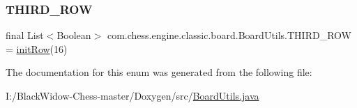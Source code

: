 \mbox{\label{enumcom_1_1chess_1_1engine_1_1classic_1_1board_1_1_board_utils_a1586314b421d641c7b8365956e7d7a90}} 
\subsubsection{\texorpdfstring{THIRD\_ROW}{THIRD\_ROW}}
{\footnotesize\ttfamily final List$<$Boolean$>$ com.\+chess.\+engine.\+classic.\+board.\+Board\+Utils.\+T\+H\+I\+R\+D\+\_\+\+R\+OW = \mbox{\hyperlink{enumcom_1_1chess_1_1engine_1_1classic_1_1board_1_1_board_utils_a00765a9cb8974e6e54dfa2cb25de687b}{init\+Row}}(16)}



The documentation for this enum was generated from the following file\+:\begin{DoxyCompactItemize}
\item 
I\+:/\+Black\+Widow-\/\+Chess-\/master/\+Doxygen/src/\mbox{\hyperlink{_board_utils_8java}{Board\+Utils.\+java}}\end{DoxyCompactItemize}
